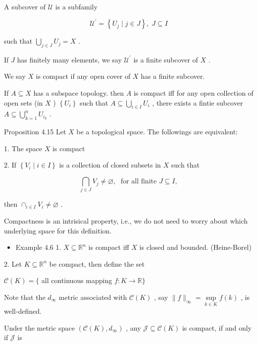 A subcover of \(\mathcal{U}\) is a subfamily

\[
{\mathcal{U}}^{\prime } = \left\{  {{U}_{j} \mid  j \in  J}\right\}  ,\;J \subseteq  I
\]

such that \(\mathop{\bigcup }\limits_{{j \in  J}}{U}_{j} = X\) .

If \(J\) has finitely many elements, we say \({\mathcal{U}}^{\prime }\) is a finite subcover of \(X\) .

We say \(X\) is compact if any open cover of \(X\) has a finite subcover.

If \(A \subseteq  X\) has a subspace topology. then \(A\) is compact iff for any open collection of open sets (in \(X\) ) \(\left\{  {U}_{i}\right\}\) such that \(A \subseteq  \mathop{\bigcup }\limits_{{i \in  I}}{U}_{i}\) , there exists a fintie subcover \(A \subseteq  \mathop{\bigcup }\limits_{{k = 1}}^{n}{U}_{{i}_{k}}\) .

Proposition 4.15 Let \(X\) be a topological space. The followings are equivalent:

1. The space \(X\) is compact

2. If \(\left\{  {{V}_{i} \mid  i \in  I}\right\}\) is a collection of closed subsets in \(X\) such that

\[
\mathop{\bigcap }\limits_{{j \in  J}}{V}_{j} \neq  \varnothing ,\;\text{ for all finite }J \subseteq  I,
\]

then \({ \cap  }_{i \in  I}{V}_{i} \neq  \varnothing\) .

Compactness is an intrisical property, i.e., we do not need to worry about which underlying space for this definition.

\begin{itemize}
\item Example 4.6 1. \(X \subseteq  {\mathbb{R}}^{n}\) is compact iff \(X\) is closed and bounded. (Heine-Borel)
\end{itemize}

2. Let \(K \subseteq  {\mathbb{R}}^{n}\) be compact, then define the set

\(\mathcal{C}\left( K\right)  = \{\) all continuous mapping \(f : K \rightarrow  \mathbb{R}\}\)

Note that the \({d}_{\infty }\) metric associated with \(\mathcal{C}\left( K\right)\) , say \(\parallel f{\parallel }_{\infty } = \mathop{\sup }\limits_{{k \in  K}}f\left( k\right)\) , is well-defined.

Under the metric space \(\left( {\mathcal{C}\left( K\right) ,{d}_{\infty }}\right)\) , any \(\mathcal{J} \subseteq  \mathcal{C}\left( K\right)\) is compact, if and only if \(\mathcal{J}\) is

